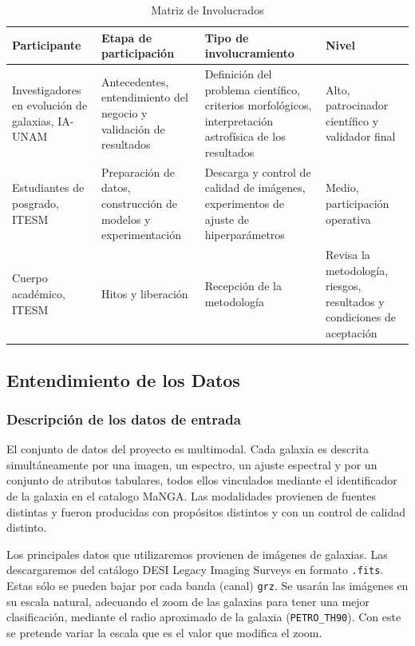 \documentclass[12pt]{article}
\begin{document}
\begin{table}[H]
\centering
\scriptsize
\begin{tabular}{|p{}|p{}|p{}|p{}|} \hline
\textbf{Participante} & \textbf{Etapa de participación} & \textbf{Tipo de involucramiento} & \textbf{Nivel} \\ \hline

Investigadores en evolución de galaxias, IA-UNAM  &
Antecedentes, entendimiento del negocio y validación de resultados  &
Definición del problema científico, criterios morfológicos, interpretación astrofísica de los resultados  &
Alto, patrocinador científico y validador final
\\ \hline

Estudiantes de posgrado, ITESM &
Preparación de datos, construcción de modelos y experimentación  &
Descarga y control de calidad de imágenes, experimentos de ajuste de hiperparámetros  &
Medio, participación operativa
\\ \hline

Cuerpo académico, ITESM  &
Hitos y liberación  &
Recepción de la metodología &
Revisa la metodología, riesgos, resultados y condiciones de aceptación
\\ \hline

\end{tabular}
\caption{Matriz de Involucrados}
\label{involucrados}
\end{table}


\subsection{Entendimiento de los Datos}
\subsubsection{Descripción de los datos de entrada}

El conjunto de datos del proyecto es multimodal. Cada galaxia es descrita simultáneamente por una imagen, un espectro, un ajuste espectral y por un conjunto de atributos tabulares, todos ellos vinculados mediante el identificador de la galaxia en el catalogo MaNGA. Las modalidades provienen de fuentes distintas y fueron producidas con propósitos distintos y con un control de calidad distinto.

Los principales datos que utilizaremos provienen de imágenes de galaxias. Las descargaremos del catálogo DESI Legacy Imaging Surveys en formato \texttt{.fits}. Estas sólo se pueden bajar por cada banda (canal) \texttt{grz}. Se usarán las imágenes en su escala natural, adecuando el zoom de las galaxias para tener una mejor clasificación, mediante el radio aproximado de la galaxia (\texttt{PETRO\_TH90}). Con este se pretende variar la escala que es el valor que modifica el zoom.
\end{document}

